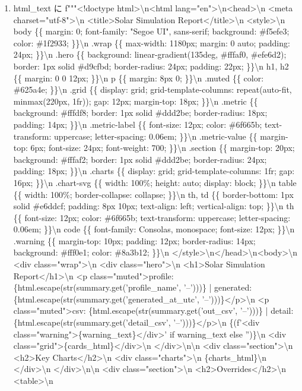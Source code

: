 \documentclass[a4paper,11pt]{article}
\begin{document}
\begin{enumerate}[leftmargin=1.8em]
\item html\_text に f"""<!doctype html>\textbackslash{}n<html lang="en">\textbackslash{}n<head>\textbackslash{}n  <meta charset="utf-8">\textbackslash{}n  <title>Solar Simulation Report</title>\textbackslash{}n  <style>\textbackslash{}n    body \{\{ margin: 0; font-family: "Segoe UI", sans-serif; background: \#f5efe3; color: \#1f2933; \}\}\textbackslash{}n    .wrap \{\{ max-width: 1180px; margin: 0 auto; padding: 24px; \}\}\textbackslash{}n    .hero \{\{ background: linear-gradient(135deg, \#fffaf0, \#efe6d2); border: 1px solid \#d9cfbd; border-radius: 24px; padding: 22px; \}\}\textbackslash{}n    h1, h2 \{\{ margin: 0 0 12px; \}\}\textbackslash{}n    p \{\{ margin: 8px 0; \}\}\textbackslash{}n    .muted \{\{ color: \#625a4e; \}\}\textbackslash{}n    .grid \{\{ display: grid; grid-template-columns: repeat(auto-fit, minmax(220px, 1fr)); gap: 12px; margin-top: 18px; \}\}\textbackslash{}n    .metric \{\{ background: \#fffdf8; border: 1px solid \#ddd2be; border-radius: 18px; padding: 14px; \}\}\textbackslash{}n    .metric-label \{\{ font-size: 12px; color: \#6f665b; text-transform: uppercase; letter-spacing: 0.06em; \}\}\textbackslash{}n    .metric-value \{\{ margin-top: 6px; font-size: 24px; font-weight: 700; \}\}\textbackslash{}n    .section \{\{ margin-top: 20px; background: \#fffaf2; border: 1px solid \#ddd2be; border-radius: 24px; padding: 18px; \}\}\textbackslash{}n    .charts \{\{ display: grid; grid-template-columns: 1fr; gap: 16px; \}\}\textbackslash{}n    .chart-svg \{\{ width: 100\%; height: auto; display: block; \}\}\textbackslash{}n    table \{\{ width: 100\%; border-collapse: collapse; \}\}\textbackslash{}n    th, td \{\{ border-bottom: 1px solid \#e6ddcf; padding: 8px 10px; text-align: left; vertical-align: top; \}\}\textbackslash{}n    th \{\{ font-size: 12px; color: \#6f665b; text-transform: uppercase; letter-spacing: 0.06em; \}\}\textbackslash{}n    code \{\{ font-family: Consolas, monospace; font-size: 12px; \}\}\textbackslash{}n    .warning \{\{ margin-top: 10px; padding: 12px; border-radius: 14px; background: \#fff0e1; color: \#8a3b12; \}\}\textbackslash{}n  </style>\textbackslash{}n</head>\textbackslash{}n<body>\textbackslash{}n  <div class="wrap">\textbackslash{}n    <div class="hero">\textbackslash{}n      <h1>Solar Simulation Report</h1>\textbackslash{}n      <p class="muted">profile: \{html.escape(str(summary.get('profile\_name', '--')))\} | generated: \{html.escape(str(summary.get('generated\_at\_utc', '--')))\}</p>\textbackslash{}n      <p class="muted">csv: \{html.escape(str(summary.get('out\_csv', '--')))\} | detail: \{html.escape(str(summary.get('detail\_csv', '--')))\}</p>\textbackslash{}n      \{(f'<div class="warning">\{warning\_text\}</div>' if warning\_text else '')\}\textbackslash{}n      <div class="grid">\{cards\_html\}</div>\textbackslash{}n    </div>\textbackslash{}n\textbackslash{}n    <div class="section">\textbackslash{}n      <h2>Key Charts</h2>\textbackslash{}n      <div class="charts">\textbackslash{}n        \{charts\_html\}\textbackslash{}n      </div>\textbackslash{}n    </div>\textbackslash{}n\textbackslash{}n    <div class="section">\textbackslash{}n      <h2>Overrides</h2>\textbackslash{}n      <table>\textbackslash{}n        
\end{enumerate}
\end{document}
